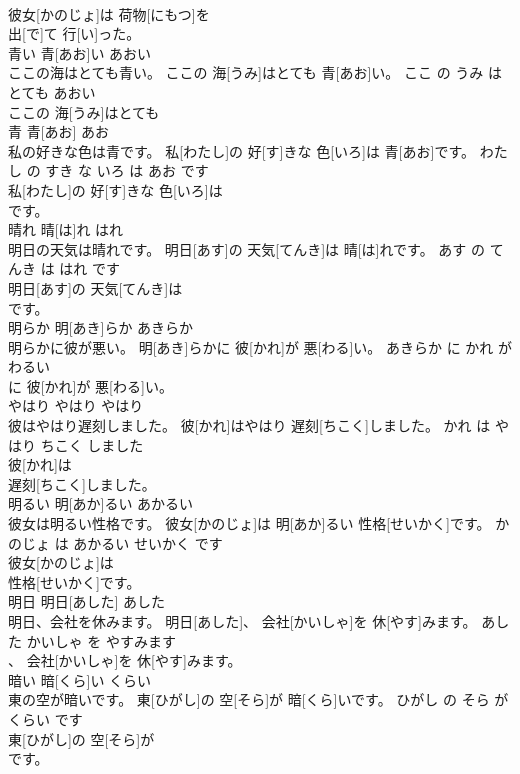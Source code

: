 \documentclass[8pt]{extreport}
\begin{document}
\begin{CJK}{UTF8}{min}
\\	彼女[かのじょ]は 荷物[にもつ]を
\\	出[で]て 行[い]った。		
\\	青い	青[あお]い	あおい	
\\	ここの海はとても青い。	ここの 海[うみ]はとても 青[あお]い。	ここ の うみ は とても あおい	
\\	ここの 海[うみ]はとても
\\	青	青[あお]	あお	
\\	私の好きな色は青です。	私[わたし]の 好[す]きな 色[いろ]は 青[あお]です。	わたし の すき な いろ は あお です	
\\	私[わたし]の 好[す]きな 色[いろ]は
\\	です。		
\\	晴れ	晴[は]れ	はれ	
\\	明日の天気は晴れです。	明日[あす]の 天気[てんき]は 晴[は]れです。	あす の てんき は はれ です	
\\	明日[あす]の 天気[てんき]は
\\	です。		
\\	明らか	明[あき]らか	あきらか	
\\	明らかに彼が悪い。	明[あき]らかに 彼[かれ]が 悪[わる]い。	あきらか に かれ が わるい	
\\	に 彼[かれ]が 悪[わる]い。		
\\	やはり	やはり	やはり	
\\	彼はやはり遅刻しました。	彼[かれ]はやはり 遅刻[ちこく]しました。	かれ は やはり ちこく しました	
\\	彼[かれ]は
\\	遅刻[ちこく]しました。		
\\	明るい	明[あか]るい	あかるい	
\\	彼女は明るい性格です。	彼女[かのじょ]は 明[あか]るい 性格[せいかく]です。	かのじょ は あかるい せいかく です	
\\	彼女[かのじょ]は
\\	性格[せいかく]です。		
\\	明日	明日[あした]	あした	
\\	明日、会社を休みます。	明日[あした]、 会社[かいしゃ]を 休[やす]みます。	あした かいしゃ を やすみます	
\\	、 会社[かいしゃ]を 休[やす]みます。		
\\	暗い	暗[くら]い	くらい	
\\	東の空が暗いです。	東[ひがし]の 空[そら]が 暗[くら]いです。	ひがし の そら が くらい です	
\\	東[ひがし]の 空[そら]が
\\	です。		

\end{CJK}
\end{document}
